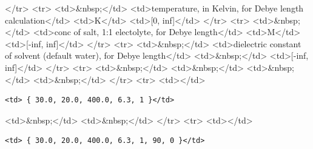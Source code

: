 \textless{}/tr\textgreater{} \textless{}tr\textgreater{} \textless{}td\textgreater{}\&nbsp;\textless{}/td\textgreater{} \textless{}td\textgreater{}temperature, in Kelvin, for Debye length calculation\textless{}/td\textgreater{} \textless{}td\textgreater{}K\textless{}/td\textgreater{} \textless{}td\textgreater{}[0, inf]\textless{}/td\textgreater{} \textless{}/tr\textgreater{} \textless{}tr\textgreater{} \textless{}td\textgreater{}\&nbsp;\textless{}/td\textgreater{} \textless{}td\textgreater{}conc of salt, 1:1 electolyte, for Debye length\textless{}/td\textgreater{} \textless{}td\textgreater{}M\textless{}/td\textgreater{} \textless{}td\textgreater{}[-inf, inf]\textless{}/td\textgreater{} \textless{}/tr\textgreater{} \textless{}tr\textgreater{} \textless{}td\textgreater{}\&nbsp;\textless{}/td\textgreater{} \textless{}td\textgreater{}dielectric constant of solvent (default water), for Debye length\textless{}/td\textgreater{} \textless{}td\textgreater{}\&nbsp;\textless{}/td\textgreater{} \textless{}td\textgreater{}[-inf, inf]\textless{}/td\textgreater{} \textless{}/tr\textgreater{} \textless{}tr\textgreater{} \textless{}td\textgreater{}\&nbsp;\textless{}/td\textgreater{} \textless{}td\textgreater{}\&nbsp;\textless{}/td\textgreater{} \textless{}td\textgreater{}\&nbsp;\textless{}/td\textgreater{} \textless{}td\textgreater{}\&nbsp;\textless{}/td\textgreater{} \textless{}/tr\textgreater{} \textless{}tr\textgreater{} \textless{}td\textgreater{}\textless{}/td\textgreater{}

\begin{verbatim}
<td> { 30.0, 20.0, 400.0, 6.3, 1 }</td>
\end{verbatim}

\textless{}td\textgreater{}\&nbsp;\textless{}/td\textgreater{} \textless{}td\textgreater{}\&nbsp;\textless{}/td\textgreater{} \textless{}/tr\textgreater{} \textless{}tr\textgreater{} \textless{}td\textgreater{}\textless{}/td\textgreater{}

\begin{verbatim}
<td> { 30.0, 20.0, 400.0, 6.3, 1, 90, 0 }</td>
\end{verbatim}

